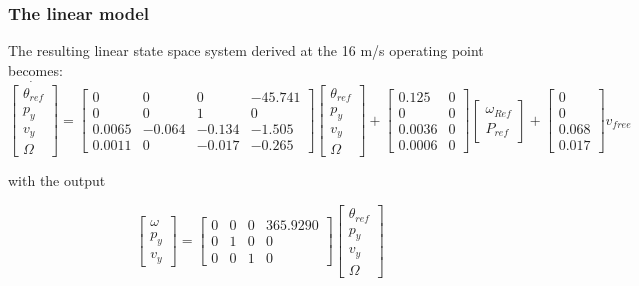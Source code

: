 \subsubsection{The linear model} \label{sec:linear_model}
The resulting linear state space system derived at the 16 m/s operating point becomes:
\begin{equation}\label{eq:xdot}
	\dot{\begin{bmatrix} \theta_{ref} \\
						p_y \\ 
						v_y \\
						\Omega \end{bmatrix}} = 
	\begin{bmatrix} 0       &  0        & 0 		& -45.741	\\
					0       &  0   		& 1    		& 0			\\
					0.0065  & -0.064	& -0.134	& -1.505	\\
					0.0011  &       0  	& -0.017	& -0.265\end{bmatrix}
	\begin{bmatrix} \theta_{ref} \\
					p_y \\ 
					v_y \\
					\Omega \end{bmatrix} + 
	\begin{bmatrix} 0.125   & 0 \\
					0       & 0	\\
					0.0036  & 0	\\
					0.0006  & 0 \end{bmatrix}
	\begin{bmatrix} \omega_{Ref} \\ 
					P_{ref} \end{bmatrix} + 
	\begin{bmatrix} 0	\\
					0		\\
					0.068 	\\
					0.017 \end{bmatrix} v_{free}
\end{equation}

\smallskip
\noindent with the output

\begin{equation}\label{eq:y}
	\begin{bmatrix} \omega \\ 
					p_y \\
					v_y \end{bmatrix} = 
	\begin{bmatrix}	0  	& 0 	& 0  	& 365.9290	\\
					0  	& 1  	& 0 	& 0			\\
					0	& 0 	& 1 	& 0 \end{bmatrix}
	\begin{bmatrix} \theta_{ref} \\
					p_y \\ 
					v_y \\
					\Omega \end{bmatrix}
\end{equation}



